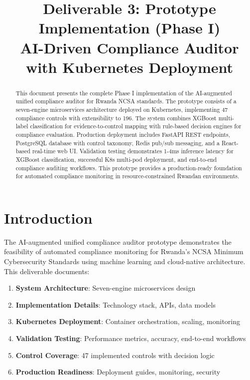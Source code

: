 \documentclass[11pt,conference]{IEEEtran}
\begin{document}
\title{Deliverable 3: Prototype Implementation (Phase I)\\AI-Driven Compliance Auditor with Kubernetes Deployment}

\author{
}

\maketitle

\begin{abstract}
This document presents the complete Phase I implementation of the AI-augmented unified compliance auditor for Rwanda NCSA standards. The prototype consists of a seven-engine microservices architecture deployed on Kubernetes, implementing 47 compliance controls with extensibility to 196. The system combines XGBoost multi-label classification for evidence-to-control mapping with rule-based decision engines for compliance evaluation. Production deployment includes FastAPI REST endpoints, PostgreSQL database with control taxonomy, Redis pub/sub messaging, and a React-based real-time web UI. Validation testing demonstrates 1-4ms inference latency for XGBoost classification, successful K8s multi-pod deployment, and end-to-end compliance auditing workflows. This prototype provides a production-ready foundation for automated compliance monitoring in resource-constrained Rwandan environments.
\end{abstract}

\section{Introduction}

The AI-augmented unified compliance auditor prototype demonstrates the feasibility of automated compliance monitoring for Rwanda's NCSA Minimum Cybersecurity Standards using machine learning and cloud-native architecture. This deliverable documents:

\begin{enumerate}
    \item \textbf{System Architecture}: Seven-engine microservices design
    \item \textbf{Implementation Details}: Technology stack, APIs, data models
    \item \textbf{Kubernetes Deployment}: Container orchestration, scaling, monitoring
    \item \textbf{Validation Testing}: Performance metrics, accuracy, end-to-end workflows
    \item \textbf{Control Coverage}: 47 implemented controls with decision logic
    \item \textbf{Production Readiness}: Deployment guides, monitoring, security
\end{enumerate}
\end{document}
